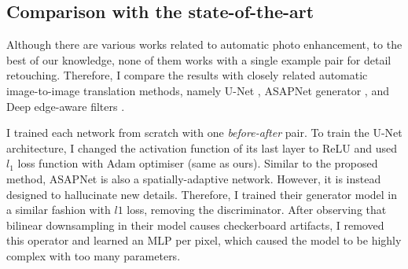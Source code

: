 \subsection{Comparison with the state-of-the-art}
\label{sec:Comparisons}


Although there are various works related to automatic photo enhancement, to the best of our knowledge, none of them works with a single example pair for detail retouching. Therefore, I compare the results with closely related automatic image-to-image translation methods, namely U-Net \cite{ronneberger2015u}, ASAPNet generator \cite{shaham2021spatially}, and Deep edge-aware filters \cite{xu2015deep}. 

I trained each network from scratch with one \textit{before-after} pair. To train the U-Net architecture, I changed the activation function of its last layer to ReLU and used $l_1$ loss function with Adam optimiser (same as ours). Similar to the proposed method, ASAPNet is also a spatially-adaptive network. However, it is instead designed to hallucinate new details. Therefore, I trained their generator model in a similar fashion with $l1$ loss, removing the discriminator. After observing that bilinear downsampling in their model causes checkerboard artifacts, I removed this operator and learned an MLP per pixel, which caused the model to be highly complex with too many parameters. 


